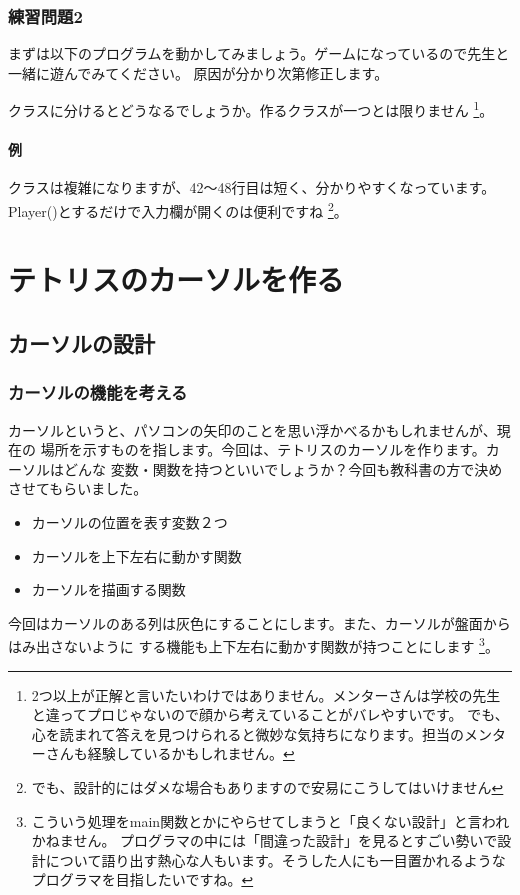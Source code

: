 \documentclass[12pt, a4paper, dvipdfmx]{book}
\begin{document}
\subsection{練習問題2}
まずは以下のプログラムを動かしてみましょう。ゲームになっているので先生と一緒に遊んでみてください。
原因が分かり次第修正します。

クラスに分けるとどうなるでしょうか。作るクラスが一つとは限りません
\footnote{2つ以上が正解と言いたいわけではありません。メンターさんは学校の先生と違ってプロじゃないので顔から考えていることがバレやすいです。
  でも、心を読まれて答えを見つけられると微妙な気持ちになります。担当のメンターさんも経験しているかもしれません。}。

\newpage
\subsubsection{例}

クラスは複雑になりますが、42〜48行目は短く、分かりやすくなっています。Player()とするだけで入力欄が開くのは便利ですね
\footnote{でも、設計的にはダメな場合もありますので安易にこうしてはいけません}。

\chapter{テトリスのカーソルを作る}
\section{カーソルの設計}
\subsection{カーソルの機能を考える}
カーソルというと、パソコンの矢印のことを思い浮かべるかもしれませんが、現在の
場所を示すものを指します。今回は、テトリスのカーソルを作ります。カーソルはどんな
変数・関数を持つといいでしょうか？今回も教科書の方で決めさせてもらいました。
\begin{itemize}
  \item カーソルの位置を表す変数２つ
  \item カーソルを上下左右に動かす関数
  \item カーソルを描画する関数
\end{itemize}
今回はカーソルのある列は灰色にすることにします。また、カーソルが盤面からはみ出さないように
する機能も上下左右に動かす関数が持つことにします
\footnote{こういう処理をmain関数とかにやらせてしまうと「良くない設計」と言われかねません。
  プログラマの中には「間違った設計」を見るとすごい勢いで設計について語り出す熱心な人もいます。そうした人にも一目置かれるようなプログラマを目指したいですね。}。
\end{document}
